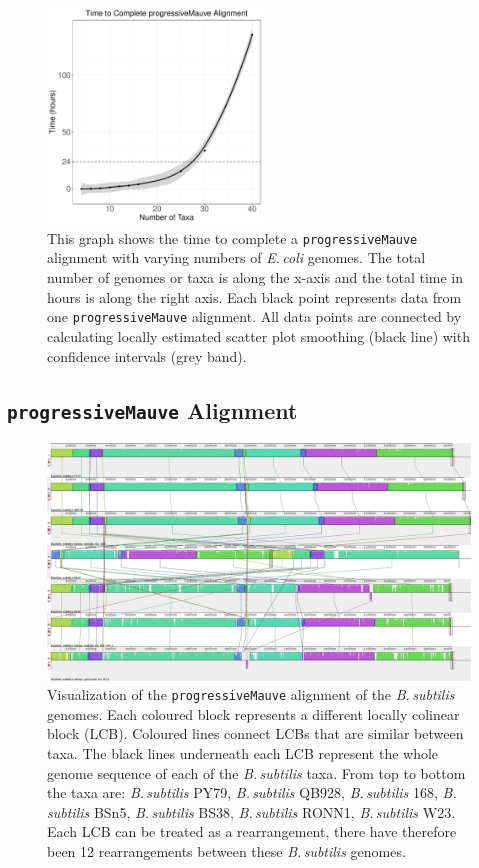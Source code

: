 \documentclass[11pt]{article}
\newcommand{\ecol}{\textit{E.\,coli}\xspace}
\newcommand{\bass}{\textit{B.\,subtilis}\xspace}
\newcommand{\p}{\texttt{progressiveMauve}\xspace}
\begin{document}
	\begin{figure}[H]
	\begin{center}
		\includegraphics[width=0.51\textwidth]{./figs/mauve_time_plot}
		\caption{\label{fig:mauvetimeplot} This graph shows the time to complete a \p alignment with varying numbers of \ecol genomes. The total number of genomes or taxa is along the x-axis and the total time in hours is along the right axis. Each black point represents data from one \p alignment. All data points are connected by calculating locally estimated scatter plot smoothing (black line) with confidence intervals (grey band).}
	\end{center}
\end{figure}
	
	
	\subsection{\p Alignment}
	\begin{figure}[H]
		\begin{center}
			\includegraphics[width=\textwidth]{./figs/Bacillus_alignment_mauve.jpg}
			\caption{\label{fig:mauvealn} Visualization of the \p alignment of the \bass genomes. Each coloured block represents a different locally colinear block (LCB). Coloured lines connect LCBs that are similar between taxa. The black lines underneath each LCB represent the whole genome sequence of each of the \bass taxa. From top to bottom the taxa are: \bass PY79, \bass QB928, \bass 168, \bass BSn5, \bass BS38, \bass RONN1, \bass W23.  Each LCB can be treated as a rearrangement, there have therefore been 12 rearrangements between these \bass genomes.}
		\end{center}
	\end{figure}
\end{document}
